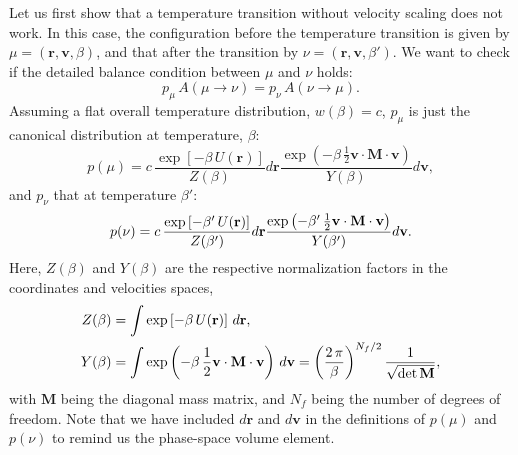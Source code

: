 \documentclass[11pt]{article}
\begin{document}
Let us first show that a temperature transition without
velocity scaling does not work.
%
In this case, the configuration before the temperature transition
is given by $\mu = (\mathbf r, \mathbf v, \beta)$,
and that after the transition by
$\nu = (\mathbf r, \mathbf v, \beta')$.
%
We want to check if the detailed balance condition
between $\mu$ and $\nu$ holds:
%
\begin{equation}
  p_\mu \, A(\mu \to \nu)
  =
  p_\nu \, A(\nu \to \mu)
  .
\label{eq:db_novs}
\end{equation}
%
Assuming a flat overall temperature distribution, $w(\beta) = c$,
$p_\mu$ is just the canonical distribution at temperature, $\beta$:
%
\begin{equation}
  p(\mu)
  =
  c \,
  \frac{
    \exp\left[
       -\beta \, U(\mathbf r)
    \right]
  }
  {
    Z(\beta)
  }
  d \mathbf r
  \frac{
    \exp\left(
      -\beta \, \frac{1}{2} \mathbf v \cdot \mathbf M \cdot \mathbf v
    \right)
  }
  {
    Y(\beta)
  }
  d \mathbf v
  ,
\label{eq:pmu}
\end{equation}
%
and $p_\nu$ that at temperature $\beta'$:
%
\begin{equation}
  p(\nu)
  =
  c \,
  \frac{
    \exp\left[
       -\beta' \, U(\mathbf r)
    \right]
  }
  {
    Z(\beta')
  }
  d \mathbf r
  \frac{
    \exp\left(
      -\beta' \, \frac{1}{2} \mathbf v \cdot \mathbf M \cdot \mathbf v
    \right)
  }
  {
    Y(\beta')
  }
  d \mathbf v
  .
\notag
\end{equation}
%
Here, $Z(\beta)$ and $Y(\beta)$
are the respective normalization factors in
the coordinates and velocities spaces,
%
\begin{align}
  Z(\beta)
  &=
  \int \exp\left[ -\beta \, U(\mathbf r) \right] \, d\mathbf r
  ,
  \notag
\\
  Y(\beta)
  &=
  \int \exp\left(
      -\beta \, \frac{1}{2} \mathbf v \cdot \mathbf M \cdot \mathbf v
  \right) \, d\mathbf v
  =
  \left(
    \frac{ 2 \, \pi } { \beta }
  \right)^{ N_f / 2 }
  \frac{
    1
  }
  {
    \sqrt{ \det \mathbf M }
  }
  ,
  \label{eq:Ybeta}
\end{align}
%
with $\mathbf M$ being the diagonal mass matrix,
and $N_f$ being the number of degrees of freedom.
%
Note that we have included $d\mathbf r$ and $d\mathbf v$
in the definitions of $p(\mu)$ and $p(\nu)$
to remind us the phase-space volume element.
\end{document}
